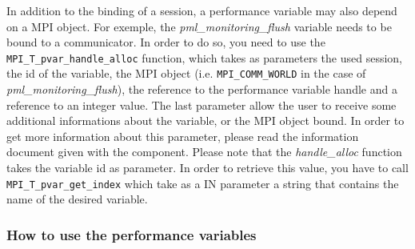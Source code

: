 \documentclass[notitlepage]{article}
\begin{document}
In addition to the binding of a session, a performance variable may
also depend on a MPI object. For exemple, the
\textit{pml\_monitoring\_flush} variable needs to be bound to a
communicator. In order to do so, you need to use the
\texttt{MPI\_T\_pvar\_handle\_alloc} function, which takes as
parameters the used session, the id of the variable, the MPI object
(i.e. \texttt{MPI\_COMM\_WORLD} in the case of
\textit{pml\_monitoring\_flush}), the reference to the performance
variable handle and a reference to an integer value. The last
parameter allow the user to receive some additional informations
about the variable, or the MPI object bound. In order to get more
information about this parameter, please read the information document
given with the component. Please note that the \textit{handle\_alloc}
function takes the variable id as parameter. In order to retrieve this
value, you have to call \texttt{MPI\_T\_pvar\_get\_index} which take as
a IN parameter a string that contains the name of the desired
variable.

\subsubsection{How to use the performance variables}
\end{document}
